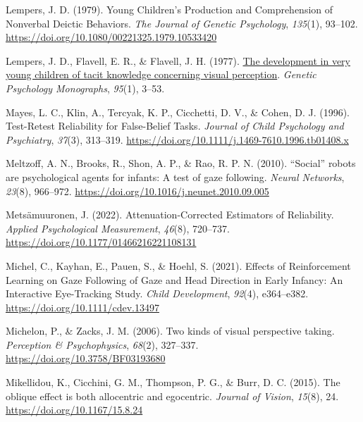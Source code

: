 \documentclass[
  man,mask,floatsintext]{apa7}
\newlength{\cslhangindent}
\newlength{\cslentryspacingunit} %
\newenvironment{CSLReferences}[2] %
 {%
  \setlength{\parindent}{0pt}
  \ifodd #1
  \let\oldpar\par
  \def\par{\hangindent=\cslhangindent\oldpar}
  \fi
  \setlength{\parskip}{#2\cslentryspacingunit}
 }%
 {}
\begin{document}
\begin{CSLReferences}{1}{0}
\leavevmode{}%
Lempers, J. D. (1979). Young {Children}'s {Production} and {Comprehension} of {Nonverbal Deictic Behaviors}. \emph{The Journal of Genetic Psychology}, \emph{135}(1), 93--102. \url{https://doi.org/10.1080/00221325.1979.10533420}

\leavevmode{}%
Lempers, J. D., Flavell, E. R., \& Flavell, J. H. (1977). \href{https://www.ncbi.nlm.nih.gov/pubmed/849832}{The development in very young children of tacit knowledge concerning visual perception}. \emph{Genetic Psychology Monographs}, \emph{95}(1), 3--53.

\leavevmode{}%
Mayes, L. C., Klin, A., Tercyak, K. P., Cicchetti, D. V., \& Cohen, D. J. (1996). Test-{Retest Reliability} for {False-Belief Tasks}. \emph{Journal of Child Psychology and Psychiatry}, \emph{37}(3), 313--319. \url{https://doi.org/10.1111/j.1469-7610.1996.tb01408.x}

\leavevmode{}%
Meltzoff, A. N., Brooks, R., Shon, A. P., \& Rao, R. P. N. (2010). {``{Social}''} robots are psychological agents for infants: {A} test of gaze following. \emph{Neural Networks}, \emph{23}(8), 966--972. \url{https://doi.org/10.1016/j.neunet.2010.09.005}

\leavevmode{}%
Metsämuuronen, J. (2022). Attenuation-{Corrected Estimators} of {Reliability}. \emph{Applied Psychological Measurement}, \emph{46}(8), 720--737. \url{https://doi.org/10.1177/01466216221108131}

\leavevmode{}%
Michel, C., Kayhan, E., Pauen, S., \& Hoehl, S. (2021). Effects of {Reinforcement Learning} on {Gaze Following} of {Gaze} and {Head Direction} in {Early Infancy}: {An Interactive Eye-Tracking Study}. \emph{Child Development}, \emph{92}(4), e364--e382. \url{https://doi.org/10.1111/cdev.13497}

\leavevmode{}%
Michelon, P., \& Zacks, J. M. (2006). Two kinds of visual perspective taking. \emph{Perception \& Psychophysics}, \emph{68}(2), 327--337. \url{https://doi.org/10.3758/BF03193680}

\leavevmode{}%
Mikellidou, K., Cicchini, G. M., Thompson, P. G., \& Burr, D. C. (2015). The oblique effect is both allocentric and egocentric. \emph{Journal of Vision}, \emph{15}(8), 24. \url{https://doi.org/10.1167/15.8.24}


\end{CSLReferences}
\end{document}
